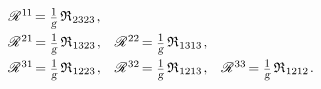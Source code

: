 \begin{otherlanguage}{russian}
{\vspace{.1em}\begin{equation*}
\begin{array}{ccc}
\mathscr{R}^{\hspace{.1ex}1\hspace{-0.1ex}1} \hspace{-0.3ex} =
\scalebox{0.8}{$ \displaystyle \frac{\raisemath{-0.2em}{1}}{\raisemath{.15em}{\smash{\textsl{g}}}} $} \hspace{.4ex} \mathfrak{R}_{\hspace{.1ex}2323}
\hspace{.2ex} ,
&
&
\\[.6em]
%
\mathscr{R}^{\hspace{.1ex}21} \hspace{-0.3ex} =
\scalebox{0.8}{$ \displaystyle \frac{\raisemath{-0.2em}{1}}{\raisemath{.15em}{\smash{\textsl{g}}}} $} \hspace{.4ex} \mathfrak{R}_{\hspace{.1ex}1323}
\hspace{.2ex} ,
&
\mathscr{R}^{\hspace{.1ex}22} \hspace{-0.3ex} =
\scalebox{0.8}{$ \displaystyle \frac{\raisemath{-0.2em}{1}}{\raisemath{.15em}{\smash{\textsl{g}}}} $} \hspace{.4ex} \mathfrak{R}_{\hspace{.1ex}1313}
\hspace{.2ex} ,
&
\\[.6em]
%
\mathscr{R}^{\hspace{.1ex}31} \hspace{-0.3ex} =
\scalebox{0.8}{$ \displaystyle \frac{\raisemath{-0.2em}{1}}{\raisemath{.15em}{\smash{\textsl{g}}}} $} \hspace{.4ex} \mathfrak{R}_{\hspace{.1ex}1223}
\hspace{.2ex} ,
&
\mathscr{R}^{\hspace{.1ex}32} \hspace{-0.3ex} =
\scalebox{0.8}{$ \displaystyle \frac{\raisemath{-0.2em}{1}}{\raisemath{.15em}{\smash{\textsl{g}}}} $} \hspace{.4ex} \mathfrak{R}_{\hspace{.1ex}1213}
\hspace{.2ex} ,
&
\mathscr{R}^{\hspace{.1ex}33} \hspace{-0.3ex} =
\scalebox{0.8}{$ \displaystyle \frac{\raisemath{-0.2em}{1}}{\raisemath{.15em}{\smash{\textsl{g}}}} $} \hspace{.4ex} \mathfrak{R}_{\hspace{.1ex}1212}
\hspace{.2ex} .
\end{array}
\end{equation*}

}
\end{otherlanguage}
